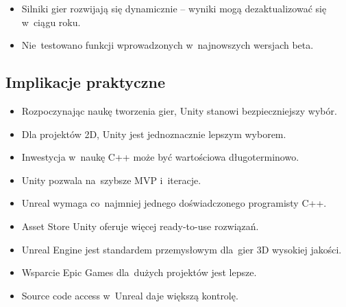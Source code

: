 \begin{itemize}
    \item Silniki gier rozwijają się dynamicznie -- wyniki mogą dezaktualizować się w~ciągu roku.
    \item Nie~testowano funkcji wprowadzonych w~najnowszych wersjach beta.
\end{itemize}

\subsection{Implikacje praktyczne}


\begin{itemize}
    \item Rozpoczynając naukę tworzenia gier, Unity stanowi bezpieczniejszy wybór.
    \item Dla projektów 2D, Unity jest jednoznacznie lepszym wyborem.
    \item Inwestycja w~naukę C++ może być wartościowa długoterminowo.
\end{itemize}


\begin{itemize}
    \item Unity pozwala na~szybsze MVP i~iteracje.
    \item Unreal wymaga co~najmniej jednego doświadczonego programisty C++.
    \item Asset Store Unity oferuje więcej ready-to-use rozwiązań.
\end{itemize}


\begin{itemize}
    \item Unreal Engine jest standardem przemysłowym dla~gier 3D wysokiej jakości.
    \item Wsparcie Epic Games dla~dużych projektów jest lepsze.
    \item Source code access w~Unreal daje większą kontrolę.
\end{itemize}
